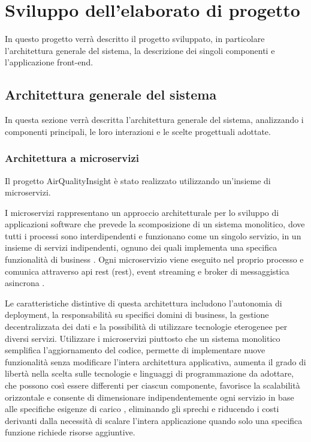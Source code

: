 \clearpage{\pagestyle{empty}\cleardoublepage}
\chapter{Sviluppo dell'elaborato di progetto}

In questo progetto verrà descritto il progetto sviluppato, in particolare l'architettura generale del sistema,
la descrizione dei singoli componenti e l'applicazione front-end.

\section{Architettura generale del sistema}

In questa sezione verrà descritta l'architettura generale del sistema, analizzando i componenti principali,
le loro interazioni e le scelte progettuali adottate.

\subsection{Architettura a microservizi}

Il progetto AirQualityInsight è stato realizzato utilizzando un'insieme di microservizi.

I microservizi rappresentano un approccio architetturale per lo sviluppo di applicazioni software che prevede
la scomposizione di un sistema monolitico, dove tutti i processi sono interdipendenti e funzionano come un singolo
servizio, in un insieme di servizi indipendenti, ognuno dei quali implementa una specifica funzionalità
di business \cite{newman2015building}. Ogni microservizio viene eseguito nel proprio processo e comunica attraverso
\acrshort{api} \acrshort{rest} (\acrlong{rest}), event streaming e broker di messaggistica asincrona
\cite{fowler2014microservices}.

Le caratteristiche distintive di questa architettura includono l'autonomia di deployment, la responsabilità
su specifici domini di business, la gestione decentralizzata dei dati e la possibilità di utilizzare
tecnologie eterogenee per diversi servizi. Utilizzare i microservizi piuttosto che un sistema monolitico
semplifica l'aggiornamento del codice, permette di implementare nuove funzionalità senza modificare
l'intera architettura applicativa, aumenta il grado di libertà nella scelta sulle tecnologie e linguaggi
di programmazione da adottare, che possono così essere differenti per ciascun componente,
favorisce la scalabilità orizzontale e consente di dimensionare indipendentemente ogni servizio
in base alle specifiche esigenze di carico \cite{dragoni2017microservices}, eliminando gli sprechi e riducendo i costi
derivanti dalla necessità di scalare l'intera applicazione quando solo una specifica funzione
richiede risorse aggiuntive.

